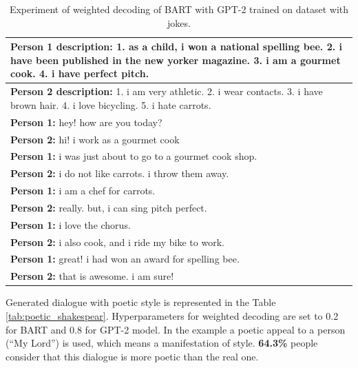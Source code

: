 \begin{table}[H]
\centering
 \begin{tabular}{|p{14cm}|} 
 \hline
 \textbf{Person 1 description:} 1. as a child, i won a national spelling bee. 2. i have been published in the new yorker magazine. 3. i am a gourmet cook. 4. i have perfect pitch. \\
 \hline
 \textbf{Person 2 description:} 1. i am very athletic. 2. i wear contacts. 3. i have brown hair. 4. i love bicycling. 5. i hate carrots. \\
 \hline
 \textbf{Person 1:} hey! how are you today? \\ 
 \textbf{Person 2:} hi! i work as a gourmet cook \\
 \textbf{Person 1:} i was just about to go to a gourmet cook shop. \\
 \textbf{Person 2:} i do not like carrots. i throw them away. \\
 \textbf{Person 1:} i am a chef for carrots.\\
 \textbf{Person 2:} really. but, i can sing pitch perfect. \\
 \textbf{Person 1:} i love the chorus. \\
 \textbf{Person 2:} i also cook, and i ride my bike to work. \\
 \textbf{Person 1:} great! i had won an award for spelling bee.\\
 \textbf{Person 2:} that is awesome. i am sure! \\
 \hline
 \end{tabular}
 \caption{Experiment of weighted decoding of BART with GPT-2 trained on dataset with jokes.}
\label{tab:combo_bart_gpt2_jokes}
\end{table}

Generated dialogue with poetic style is represented in the Table \ref{tab:poetic_shakespear}. Hyperparameters for weighted decoding are set to 0.2 for BART and 0.8 for GPT-2 model. In the example a poetic appeal to a person (``My Lord'') is used, which means a manifestation of style. \textbf{64.3\%} people consider that this dialogue is more poetic than the real one.

